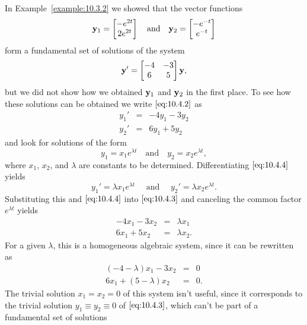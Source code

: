 \documentclass{ximera}
\begin{document}
In Example~\ref{example:10.3.2} we showed that the vector
functions
$$
{\bf y}_1=\begin{bmatrix} -e^{2t}\\2e^{2t}\end{bmatrix}\quad\mbox{and}\quad
{\bf y}_2=\begin{bmatrix}-e^{-t}\\e^{-t}\end{bmatrix}
$$
form a fundamental set of solutions of the system
\begin{equation}\label{eq:10.4.2}
{\bf y}'=\begin{bmatrix}-4&-3\\6&5\end{bmatrix} {\bf y},
\end{equation}
but we did not show how we obtained ${\bf y}_1$ and ${\bf y}_2$ in the
first place. To see how these solutions can be obtained we write
$\eqref{eq:10.4.2}$ as
\begin{equation}\label{eq:10.4.3}
\begin{array}{ccc}
y_1'&=&-4y_1-3y_2\\y_2'&=&6y_1+5y_2\end{array}
\end{equation}
and look for solutions of the form
\begin{equation}\label{eq:10.4.4}
y_1=x_1e^{\lambda t}\quad\mbox{and}\quad y_2=x_2e^{\lambda t},
\end{equation}
where $x_1$, $x_2$, and $\lambda$ are constants to be determined.
 Differentiating  $\eqref{eq:10.4.4}$ yields
$$
y_1'=\lambda x_1e^{\lambda
t}\quad\mbox{ and }\quad y_2'=\lambda x_2e^{\lambda t}.
$$
Substituting this and  $\eqref{eq:10.4.4}$ into  $\eqref{eq:10.4.3}$ and canceling
the common factor $e^{\lambda t}$ yields
$$
\begin{array}{ccc}-4x_1-3x_2&=&\lambda x_1 \\
6 x_1+5x_2&=&\lambda x_2.\end{array}
$$
For a given $\lambda$, this is a homogeneous algebraic system, since it can
be rewritten as
\begin{equation}\label{eq:10.4.5}
\begin{array}{rcl} (-4-\lambda) x_1-3 x_2&=&0\\
6 x_1+(5-\lambda) x_2&=&0.\end{array}
\end{equation}
The trivial solution $x_1=x_2=0$ of this system isn't  useful, since
it corresponds to the trivial solution $y_1\equiv y_2\equiv0$ of
$\eqref{eq:10.4.3}$, which can't be part of a fundamental set of solutions
\end{document}
